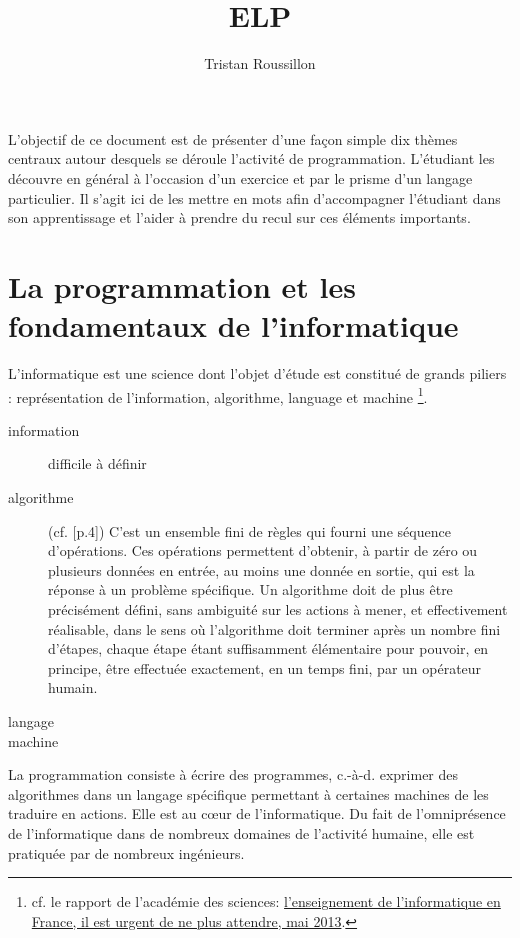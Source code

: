 \documentclass[a4paper,francais]{insalyon}
\title{ELP}
\author{Tristan Roussillon}
\newcommand{\cad}{c.-à-d.}
\begin{document}
\maketitle

L'objectif de ce document est de présenter d'une façon simple dix thèmes centraux autour desquels se déroule l'activité de programmation. L'étudiant les découvre en général à l'occasion d'un exercice et par le prisme d'un langage particulier. Il s'agit ici de les mettre en mots afin d'accompagner l'étudiant dans son apprentissage et l'aider à prendre du recul sur ces éléments importants. 

\section{La programmation et les fondamentaux de l'informatique}

L'informatique est une science dont l'objet d'étude est constitué de grands piliers : représentation de l'information, algorithme, language et machine
\footnote{cf. le rapport de l'académie des sciences:
  \href{https://www.academie-sciences.fr/pdf/rapport/rads\_0513.pdf}
  {l'enseignement de l'informatique en France, il est urgent de ne plus attendre, mai 2013}.
  }.
\begin{description}
\item[information] difficile à définir 
\item[algorithme] (cf. \cite{knuth}[p.4]) C'est un ensemble fini de règles qui fourni une séquence d'opérations. Ces opérations permettent d'obtenir, à partir de zéro ou plusieurs données en entrée, au moins une donnée en sortie, qui est la réponse à un problème spécifique. Un algorithme doit de plus être précisément défini, sans ambiguité sur les actions à mener, et effectivement réalisable, dans le sens où l'algorithme doit terminer après un nombre fini d'étapes, chaque étape étant suffisamment élémentaire pour pouvoir, en principe, être effectuée exactement, en un temps fini, par un opérateur humain.
\item[langage] 
\item[machine] 
\end{description}

La programmation consiste à écrire des programmes, {\cad} exprimer des algorithmes dans un langage spécifique permettant à certaines machines de les traduire en actions.
Elle est au c\oe ur de l'informatique. Du fait de l'omniprésence de l'informatique dans de nombreux domaines de l'activité humaine, elle est pratiquée par de nombreux ingénieurs. 
\end{document}
